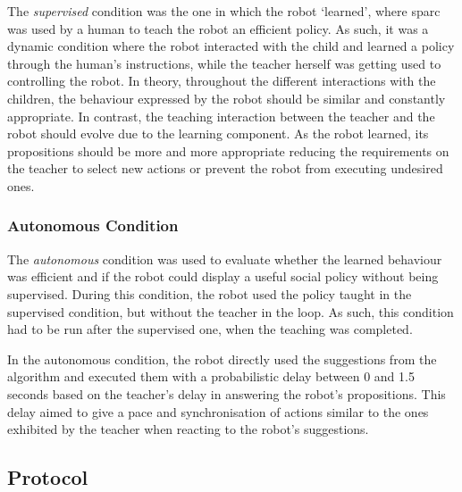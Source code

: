 The \textit{supervised} condition was the one in which the robot `learned', where \gls{sparc} was used by a human to teach the robot an efficient policy. As such, it was a dynamic condition where the robot interacted with the child and learned a policy through the human's instructions, while the teacher herself was getting used to controlling the robot. In theory, throughout the different interactions with the children, the behaviour expressed by the robot should be similar and constantly appropriate. In contrast, the teaching interaction between the teacher and the robot should evolve due to the learning component. As the robot learned, its propositions should be more and more appropriate reducing the requirements on the teacher to select new actions or prevent the  robot from executing undesired ones.

\subsubsection{Autonomous Condition}

The \textit{autonomous} condition was used to evaluate whether the learned behaviour was efficient and if the robot could display a useful social policy without being supervised. During this condition, the robot used the policy taught in the supervised condition, but without the teacher in the loop. As such, this condition had to be run after the supervised one, when the teaching was completed. %

In the autonomous condition, the robot directly used the suggestions from the algorithm and executed them with a probabilistic delay between 0 and 1.5 seconds based on the teacher's delay in answering the robot's propositions. This delay aimed to give a pace and synchronisation of actions similar to the ones exhibited by the teacher when reacting to the robot's suggestions.

\subsection{Protocol}

